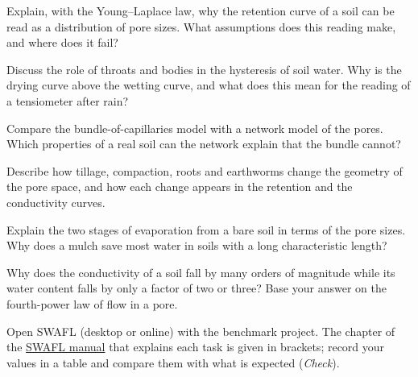 \begin{exlist}
\item Explain, with the Young--Laplace law, why the retention curve of a soil can be read as a distribution of pore sizes. What assumptions does this reading make, and where does it fail?
\item Discuss the role of throats and bodies in the hysteresis of soil water. Why is the drying curve above the wetting curve, and what does this mean for the reading of a tensiometer after rain?
\item Compare the bundle-of-capillaries model with a network model of the pores. Which properties of a real soil can the network explain that the bundle cannot?
\item Describe how tillage, compaction, roots and earthworms change the geometry of the pore space, and how each change appears in the retention and the conductivity curves.
\item Explain the two stages of evaporation from a bare soil in terms of the pore sizes. Why does a mulch save most water in soils with a long characteristic length?
\item Why does the conductivity of a soil fall by many orders of magnitude while its water content falls by only a factor of two or three? Base your answer on the fourth-power law of flow in a pore.
\end{exlist}
{\small Open SWAFL (desktop or online) with the benchmark project. The chapter of the \href{https://github.com/halilunaziru73-creator/Coupled-Water-Fluxes-Pore-Scale-Dynamics-Precision-Irrigation-Mulching-Feedback-Loops/raw/main/Software/v1.1.0/SWAFL_Desktop/docs/manual_v1.1.0/SWAFL_Manual_v1.1.0.pdf}{SWAFL manual} that explains each task is given in brackets; record your values in a table and compare them with what is expected (\emph{Check}).}\par\vspace{3pt}
